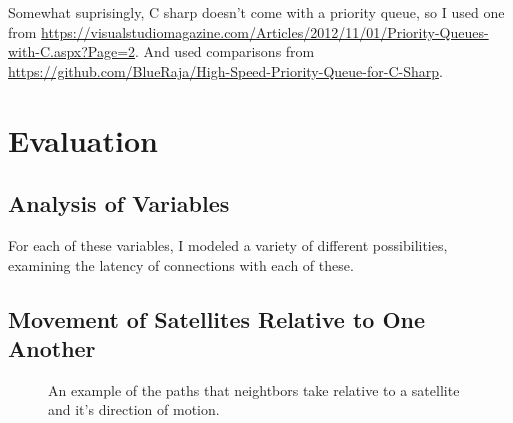 \documentclass[12pt]{article}
\begin{document}
Somewhat suprisingly, C sharp doesn't come with a priority queue, so I used one from \url{https://visualstudiomagazine.com/Articles/2012/11/01/Priority-Queues-with-C.aspx?Page=2}. And used comparisons from \url{https://github.com/BlueRaja/High-Speed-Priority-Queue-for-C-Sharp}.

\section{Evaluation}

\subsection{Analysis of Variables}
For each of these variables, I modeled a variety of different possibilities, examining the latency of connections with each of these.


\subsection{Movement of Satellites Relative to One Another}

\begin{figure}
\label{fig:Relative Paths of Satellites}
\caption{An example of the paths that neightbors take relative to a satellite and it's direction of motion.}
\end{figure}
\end{document}
